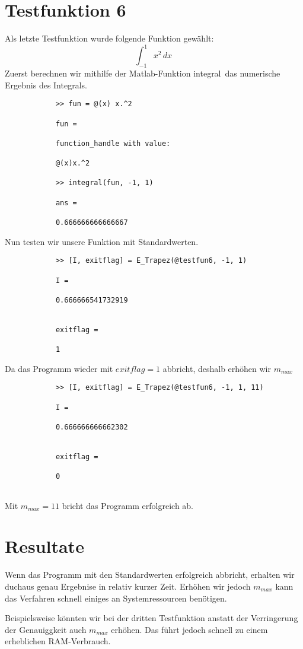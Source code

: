 \documentclass[11pt,titlepage]{article}
\begin{document}
	\section{Testfunktion 6}
		Als letzte Testfunktion wurde folgende Funktion gewählt:
		\begin{displaymath}
			\int_{-1}^1  x^2 \, dx\
		\end{displaymath}
		Zuerst berechnen wir mithilfe der Matlab-Funktion \glqq integral\grqq \, das numerische Ergebnis des Integrals.
		\begin{lstlisting}
			>> fun = @(x) x.^2
			
			fun =
			
			function_handle with value:
			
			@(x)x.^2
			
			>> integral(fun, -1, 1)
			
			ans =
			
			0.666666666666667
		\end{lstlisting}
		Nun testen wir unsere Funktion mit Standardwerten.
		\begin{lstlisting}
			>> [I, exitflag] = E_Trapez(@testfun6, -1, 1)
			
			I =
			
			0.666666541732919
			
			
			exitflag =
			
			1
		\end{lstlisting}
		Da das Programm wieder mit $exitflag = 1$ abbricht, deshalb erhöhen wir $m_{max}$
		\begin{lstlisting}
			>> [I, exitflag] = E_Trapez(@testfun6, -1, 1, 11)
			
			I =
			
			0.666666666662302
			
			
			exitflag =
			
			0
			
		\end{lstlisting}
		Mit $m_{max} = 11$ bricht das Programm erfolgreich ab.
		
	\section{Resultate}
		 Wenn das Programm mit den Standardwerten erfolgreich abbricht, erhalten wir duchaus genau Ergebnise in relativ kurzer Zeit. Erhöhen wir jedoch $m_{max}$ kann das Verfahren schnell einiges an Systemressourcen benötigen.
		 
		 Beispielsweise könnten wir bei der dritten Testfunktion anstatt der Verringerung der Genauiggkeit auch $m_{max}$ erhöhen. Das führt jedoch schnell zu einem erheblichen RAM-Verbrauch. 
		 
\end{document}
